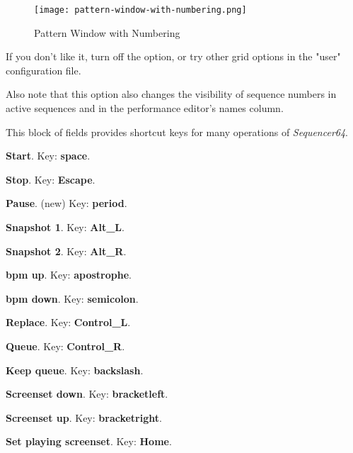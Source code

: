 \begin{figure}[H]
   \centering 
   \texttt{[image: pattern-window-with-numbering.png]}
   \caption{Pattern Window with Numbering}
   \label{fig:seq64_build_with_numbering}
\end{figure}

   If you don't like it, turn off the option, or try other grid options
   in the "user" configuration file.

   Also note that this option also changes the visibility of sequence numbers
   in active sequences and in the performance editor's names column.

   This block of fields provides shortcut keys for many operations of
   \textsl{Sequencer64}.

   \begin{enumber}
      \item \textbf{Start}.
         Key:  \textbf{space}.
      \item \textbf{Stop}.
         Key:  \textbf{Escape}.
      \item \textbf{Pause}. (new)
         Key:  \textbf{period}.
      \item \textbf{Snapshot 1}.
         Key:  \textbf{Alt\_L}.
      \item \textbf{Snapshot 2}.
         Key:  \textbf{Alt\_R}.
      \item \textbf{bpm up}.
         Key:  \textbf{apostrophe}.
      \item \textbf{bpm down}.
         Key:  \textbf{semicolon}.
      \item \textbf{Replace}.
         Key:  \textbf{Control\_L}.
      \item \textbf{Queue}.
         Key:  \textbf{Control\_R}.
      \item \textbf{Keep queue}.
         Key:  \textbf{backslash}.
      \item \textbf{Screenset down}.
         Key: \index{keys![} \textbf{bracketleft}.
      \item \textbf{Screenset up}.
         Key: \index{keys!]} \textbf{bracketright}.
      \item \textbf{Set playing screenset}.
         Key:  \textbf{Home}.
   \end{enumber}

